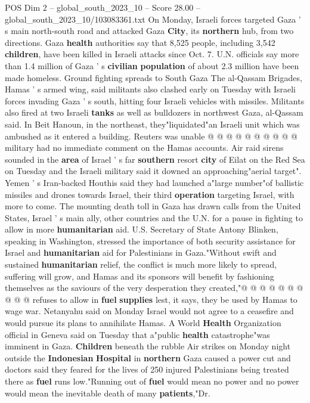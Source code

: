 \begin{textsample}{POS Dim 2 – global\_south\_2023\_10 – Score 28.00 – global\_south\_2023\_10/103083361.txt}
On Monday, Israeli forces targeted Gaza ' s main north-south road and attacked Gaza \textbf{City}, its \textbf{northern} hub, from two directions.
Gaza \textbf{health} authorities say that 8,525 people, including 3,542 \textbf{children}, have been killed in Israeli attacks since Oct. 7.
U.N. officials say more than 1.4 million of Gaza ' s \textbf{civilian} \textbf{population} of about 2.3 million have been made homeless.
Ground fighting spreads to South Gaza The al-Qassam Brigades, Hamas ' s armed wing, said militants also clashed early on Tuesday with Israeli forces invading Gaza ' s south, hitting four Israeli vehicles with missiles.
Militants also fired at two Israeli \textbf{tanks} as well as bulldozers in northwest Gaza, al-Qassam said.
In Beit Hanoun, in the northeast, they"liquidated"an Israeli unit which was ambushed as it entered a building.
Reuters was unable @ @ @ @ @ @ @ @ @ @ military had no immediate comment on the Hamas accounts.
Air raid sirens sounded in the \textbf{area} of Israel ' s far \textbf{southern} resort \textbf{city} of Eilat on the Red Sea on Tuesday and the Israeli military said it downed an approaching"aerial target".
Yemen ' s Iran-backed Houthis said they had launched a"large number"of ballistic missiles and drones towards Israel, their third \textbf{operation} targeting Israel, with more to come.
The mounting death toll in Gaza has drawn calls from the United States, Israel ' s main ally, other countries and the U.N. for a pause in fighting to allow in more \textbf{humanitarian} aid.
U.S.
Secretary of State Antony Blinken, speaking in Washington, stressed the importance of both security assistance for Israel and \textbf{humanitarian} aid for Palestinians in Gaza."Without swift and sustained \textbf{humanitarian} relief, the conflict is much more likely to spread, suffering will grow, and Hamas and its sponsors will benefit by fashioning themselves as the saviours of the very desperation they created,"@ @ @ @ @ @ @ @ @ @ refuses to allow in \textbf{fuel} \textbf{supplies} lest, it says, they be used by Hamas to wage war.
Netanyahu said on Monday Israel would not agree to a ceasefire and would pursue its plans to annihilate Hamas.
A World \textbf{Health} Organization official in Geneva said on Tuesday that a"public \textbf{health} catastrophe"was imminent in Gaza. \textbf{Children} beneath the rubble Air strikes on Monday night outside the \textbf{Indonesian} \textbf{Hospital} in \textbf{northern} Gaza caused a power cut and doctors said they feared for the lives of 250 injured Palestinians being treated there as \textbf{fuel} runs low."Running out of \textbf{fuel} would mean no power and no power would mean the inevitable death of many \textbf{patients},"Dr.

\end{textsample}

